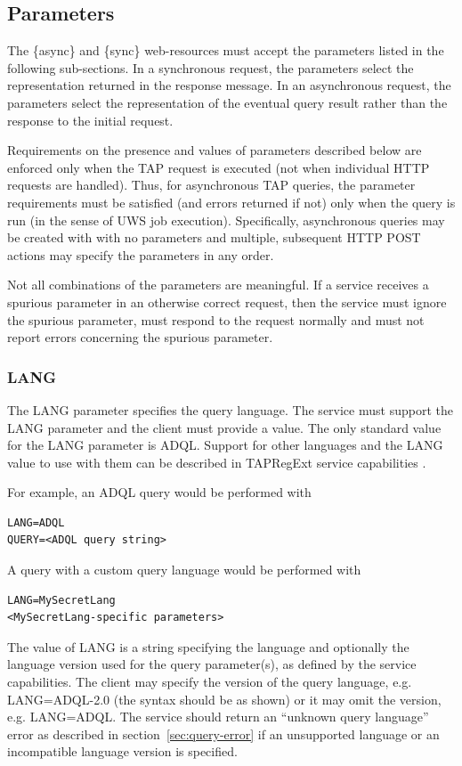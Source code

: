 \documentclass[11pt,letter]{ivoa}
\begin{document}
\subsection{Parameters}
\label{sec:parameters}

The \{async\} and \{sync\} web-resources must accept the parameters listed in 
the following sub-sections. In a synchronous request, the parameters select the 
representation returned in the response message. In an asynchronous request, the 
parameters select the representation of the eventual query result rather than 
the response to the initial request.

Requirements on the presence and values of parameters described below are 
enforced only when the TAP request is executed (not when individual HTTP 
requests are handled). Thus, for asynchronous TAP queries, the parameter 
requirements must be satisfied (and errors returned if not) only when the query 
is run (in the sense of UWS job execution). Specifically, asynchronous 
queries may be created with with no parameters and multiple, subsequent HTTP 
POST actions may specify the parameters in any order.

Not all combinations of the parameters are meaningful. If a 
service receives a spurious parameter in an otherwise correct request, then the 
service must ignore the spurious parameter, must respond to the request normally 
and must not report errors concerning the spurious parameter.

\subsubsection{LANG}
\label{sec:LANG}

The LANG parameter specifies the query language. The service must support the LANG 
parameter and the client must provide a value. The only standard 
value for the LANG parameter is ADQL. Support for other 
languages and the LANG value to use with them can be described in
TAPRegExt service 
capabilities \citep{2012ivoa.spec.0827D}.

For example, an ADQL query would be performed with
\begin{verbatim}
LANG=ADQL
QUERY=<ADQL query string>
\end{verbatim}
A query with a custom query language would be performed with
\begin{verbatim}
LANG=MySecretLang
<MySecretLang-specific parameters>
\end{verbatim}
The value of LANG is a string specifying the language and optionally the 
language version used for the query parameter(s), as defined by the service 
capabilities.  The client may specify the version of the query language,  e.g. 
LANG=ADQL-2.0 (the syntax should be as shown) or it may omit the version, e.g. 
LANG=ADQL.  The service should return an “unknown query language” error as 
described in section~\ref{sec:query-error} if an unsupported language or an incompatible 
language version is specified.
\end{document}
